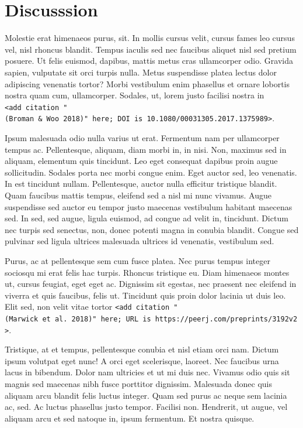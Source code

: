 \documentclass[11pt,]{report}
\begin{document}
\hypertarget{discusssion}{%
\chapter{Discusssion}\label{discusssion}}

Molestie erat himenaeos purus, sit. In mollis cursus velit, cursus fames
leo cursus vel, nisl rhoncus blandit. Tempus iaculis sed nec faucibus
aliquet nisl sed pretium posuere. Ut felis euismod, dapibus, mattis
metus cras ullamcorper odio. Gravida sapien, vulputate sit orci turpis
nulla. Metus suspendisse platea lectus dolor adipiscing venenatis
tortor? Morbi vestibulum enim phasellus et ornare lobortis nostra quam
cum, ullamcorper. Sodales, ut, lorem justo facilisi nostra in
\texttt{\textless{}add\ citation\ "(Broman\ \&\ Woo\ 2018)"\ here;\ DOI\ is\ 10.1080/00031305.2017.1375989\textgreater{}}.

Ipsum malesuada odio nulla varius ut erat. Fermentum nam per ullamcorper
tempus ac. Pellentesque, aliquam, diam morbi in, in nisi. Non, maximus
sed in aliquam, elementum quis tincidunt. Leo eget consequat dapibus
proin augue sollicitudin. Sodales porta nec morbi congue enim. Eget
auctor sed, leo venenatis. In est tincidunt nullam. Pellentesque, auctor
nulla efficitur tristique blandit. Quam faucibus mattis tempus, eleifend
sed a nisl mi nunc vivamus. Augue suspendisse sed auctor eu tempor justo
maecenas vestibulum habitant maecenas sed. In sed, sed augue, ligula
euismod, ad congue ad velit in, tincidunt. Dictum nec turpis sed
senectus, non, donec potenti magna in conubia blandit. Congue sed
pulvinar sed ligula ultrices malesuada ultrices id venenatis, vestibulum
sed.

Purus, ac at pellentesque sem cum fusce platea. Nec purus tempus integer
sociosqu mi erat felis hac turpis. Rhoncus tristique eu. Diam himenaeos
montes ut, cursus feugiat, eget eget ac. Dignissim sit egestas, nec
praesent nec eleifend in viverra et quis faucibus, felis ut. Tincidunt
quis proin dolor lacinia ut duis leo. Elit sed, non velit vitae tortor
\texttt{\textless{}add\ citation\ "(Marwick\ et\ al.\ 2018)"\ here;\ URL\ is\ https://peerj.com/preprints/3192v2\textgreater{}}.

Tristique, at et tempus, pellentesque conubia et nisl etiam orci nam.
Dictum ipsum volutpat eget nunc! A orci eget scelerisque, laoreet. Nec
faucibus urna lacus in bibendum. Dolor nam ultricies et ut mi duis nec.
Vivamus odio quis sit magnis sed maecenas nibh fusce porttitor
dignissim. Malesuada donec quis aliquam arcu blandit felis luctus
integer. Quam sed purus ac neque sem lacinia ac, sed. Ac luctus
phasellus justo tempor. Facilisi non. Hendrerit, ut augue, vel aliquam
arcu et sed natoque in, ipsum fermentum. Et nostra quisque.
\end{document}
